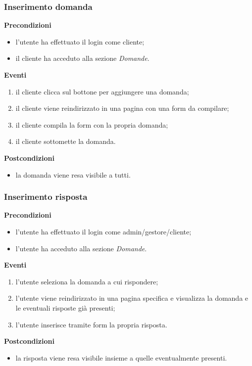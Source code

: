 \documentclass[a4paper, 14pt]{article}
\begin{document}
\begin{flushleft}
			\bigskip
			\subsubsection{Inserimento domanda}
			\textbf{Precondizioni}
			\begin{itemize}
				\item l'utente ha effettuato il login come cliente;
				\item il cliente ha acceduto alla sezione \textit{Domande}.
			\end{itemize}
			\textbf{Eventi}
			\begin{enumerate}
				\item il cliente clicca sul bottone per aggiungere una domanda;
				\item il cliente viene reindirizzato in una pagina con una form da compilare;
				\item il cliente compila la form con la propria domanda;
				\item il cliente sottomette la domanda.
			\end{enumerate}
			\textbf{Postcondizioni}
			\begin{itemize}
				\item la domanda viene resa visibile a tutti.
			\end{itemize}
			
			\bigskip
			\subsubsection{Inserimento risposta}
			\textbf{Precondizioni}
			\begin{itemize}
				\item l'utente ha effettuato il login come admin/gestore/cliente;
				\item l'utente ha acceduto alla sezione \textit{Domande}.
			\end{itemize}
			\textbf{Eventi}
			\begin{enumerate}
				\item l'utente seleziona la domanda a cui rispondere;
				\item l'utente viene reindirizzato in una pagina specifica e visualizza la domanda e le eventuali risposte già presenti;
				\item l'utente inserisce tramite form la propria risposta.
			\end{enumerate}
			\textbf{Postcondizioni}
			\begin{itemize}
				\item la risposta viene resa visibile insieme a quelle eventualmente presenti.
			\end{itemize}
			

\end{flushleft}
\end{document}
